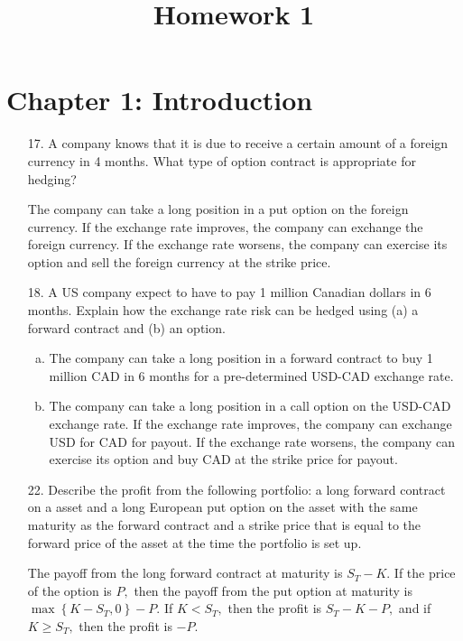 \documentclass{article}
\begin{document}
\title{Homework 1}
\maketitle
\thispagestyle{fancy}

\section*{Chapter 1: Introduction}

\begin{itemize}
	\item[17.] A company knows that it is due to receive a certain amount of a foreign currency in 4 months. What type of option contract is appropriate for hedging?
		\begin{answer*}
			The company can take a long position in a put option on the foreign currency. If the exchange rate improves, the company can exchange the foreign currency. If the exchange rate worsens, the company can exercise its option and sell the foreign currency at the strike price.
		\end{answer*}

	\item[18.] A US company expect to have to pay 1 million Canadian dollars in 6 months. Explain how the exchange rate risk can be hedged using (a) a forward contract and (b) an option.
		\begin{answer*}
			\begin{enumerate}[(a)]
				\item The company can take a long position in a forward contract to buy 1 million CAD in 6 months for a pre-determined USD-CAD exchange rate. 

				\item The company can take a long position in a call option on the USD-CAD exchange rate. If the exchange rate improves, the company can exchange USD for CAD for payout. If the exchange rate worsens, the company can exercise its option and buy CAD at the strike price for payout.
					
			\end{enumerate}
		\end{answer*}

	\item[22.] Describe the profit from the following portfolio: a long forward contract on a asset and a long European put option on the asset with the same maturity as the forward contract and a strike price that is equal to the forward price of the asset at the time the portfolio is set up.
		\begin{answer*}
			The payoff from the long forward contract at maturity is $S_T-K.$ If the price of the option is $P,$ then the payoff from the put option at maturity is $\max\left\{ K-S_T, 0 \right\}-P.$ If $K<S_T,$ then the profit is $S_T-K-P,$ and if $K\ge S_T,$ then the profit is $-P.$
		\end{answer*}


\end{itemize}
\end{document}
